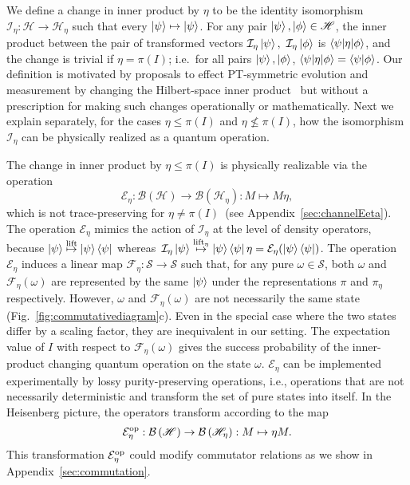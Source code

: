 \documentclass[amsmath,amssymb,aps,pra,superscriptaddress,twocolumn]{revtex4-2}
\begin{document}
We define a change in inner product by $\eta$
to be the identity isomorphism~$\mathcal{I}_{\eta}:\mathscr H \to \mathscr{H}_{\eta}$ such that
every $\ket{\psi} \mapsto \ket{\psi}$.
For any pair $\ket{\psi},\ket{\phi}\in\mathscr{H}$,
the inner product between the pair of transformed vectors $\mathcal{I}_{\eta}\ket{\psi},\ \mathcal{I}_{\eta}\ket{\phi}$ 
is $\braket{\psi|\eta|\phi}$,
and the change is trivial if $\eta = \pi(I)$; i.e.\ 
for all pairs $\ket{\psi},\ket{\phi}$, $\braket{\psi|\eta|\phi} = \braket{\psi|\phi}$.
Our definition is motivated by proposals to effect PT-symmetric evolution and measurement by 
changing the Hilbert-space inner product~\cite{BBJM07,BBC+13} but without a 
prescription for making such changes operationally or mathematically.
Next we explain separately, for the cases $\eta \le \pi(I)$ and $\eta \nleq \pi(I)$,
how the isomorphism $\mathcal{I}_\eta$ can be physically realized as a quantum operation.


The change in inner product by $\eta \le \pi(I)$ is physically realizable 
via the operation 
\begin{equation}\label{eq:Etilde}
    \mathcal{E}_\eta:\mathcal{B}\left(\mathscr H\right) \to \mathcal{B}\left(\mathscr{H}_{\eta}\right):M \mapsto M\eta,
\end{equation}
which is not trace-preserving for $\eta \ne \pi(I)$~(see Appendix~\ref{sec:channelEeta}).
The operation  $\mathcal{E}_\eta$ mimics the action of $\mathcal{I}_{\eta}$ at the level of density operators,
because $\ket{\psi} \stackrel{\operatorname{lift}}{\mapsto}\ket{\psi}\bra{\psi}$
whereas~$\mathcal{I}_{\eta}\ket{\psi} \stackrel{\operatorname{lift}_{\eta}}{\mapsto}\ket{\psi}\bra{\psi}\eta = 
\mathcal{E}_\eta(\ket{\psi}\bra{\psi})$.
The operation $\mathcal{E}_\eta$ induces a linear map 
$\mathcal{F}_\eta:\mathcal{S} \to \mathcal{S}$
such that, for any pure $\omega\in \mathcal{S}$, both $\omega$ and $\mathcal{F}_\eta(\omega)$ are represented by the 
same $\ket{\psi}$ under the representations $\pi$ and $\pi_{\eta}$ respectively.
However, $\omega$ and $\mathcal{F}_\eta(\omega)$ are not necessarily the same state (Fig.~\ref{fig:commutativediagram}c).
Even in the special case where the two states differ by a scaling factor,
they are inequivalent in our setting.
The expectation value of $I$ with respect to 
$\mathcal{F}_\eta(\omega)$ gives the success probability
of the inner-product changing quantum operation on the state $\omega$.
$\mathcal{E}_\eta$ can be implemented experimentally 
by lossy purity-preserving operations,
i.e., operations that are not necessarily deterministic and 
transform the set of pure states into itself.
In the Heisenberg picture,
the operators transform according to the map
\begin{equation}\label{eq:Edual}
\mathcal{E}^{\rm op}_\eta:\mathcal{B}\left(\mathscr H\right) \to \mathcal{B}\left(\mathscr{H}_{\eta}\right):M \mapsto \eta M.
\end{equation}
This transformation $\mathcal{E}^{\rm op}_\eta$ could modify  
commutator relations as we show in Appendix~\ref{sec:commutation}.
\end{document}
